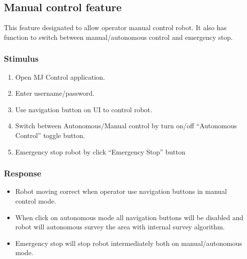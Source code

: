 \documentclass[10pt,a4paper,titlepage]{article}
\begin{document}
	\subsection{Manual control feature }
	This feature designated to allow operator manual control robot. It also has function to switch between manual/autonomous control and emergency stop.
	
	\subsubsection*{Stimulus}
	\begin{enumerate}
		\item Open MJ Control application.
		\item Enter username/password.
		\item Use navigation button on UI to control robot.
		\item Switch between Autonomous/Manual control by turn on/off “Autonomous Control” toggle button.
		\item Emergency stop robot by click “Emergency Stop” button
	\end{enumerate}
	
	\subsubsection*{Response}
	\begin{itemize}
		\item Robot moving correct when operator use navigation buttons in manual control mode.
		\item When click on autonomous mode all navigation buttons will be disabled and robot will autonomous survey the area with internal survey algorithm.
		\item Emergency stop will stop robot intermediately both on manual/autonomous mode.
	\end{itemize}
	
\end{document}
